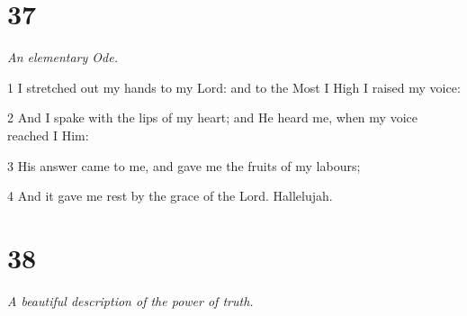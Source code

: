 \chapter{37}

\par \textit{An elementary Ode.}

\par 1 I stretched out my hands to my Lord: and to the Most I High I raised my voice:
\par 2 And I spake with the lips of my heart; and He heard me, when my voice reached I Him:
\par 3 His answer came to me, and gave me the fruits of my labours;
\par 4 And it gave me rest by the grace of the Lord. Hallelujah.



\chapter{38}

\par \textit{A beautiful description of the power of truth.}

